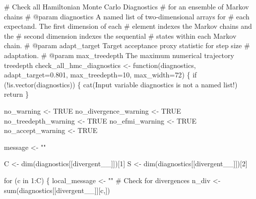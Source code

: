 \documentclass[
  letterpaper,
  DIV=11,
  numbers=noendperiod]{scrartcl}
\newenvironment{Shaded}{\begin{snugshade}}{\end{snugshade}}
\newcommand{\AttributeTok}[1]{\textcolor[rgb]{0.40,0.45,0.13}{#1}}
\newcommand{\CommentTok}[1]{\textcolor[rgb]{0.37,0.37,0.37}{#1}}
\newcommand{\ConstantTok}[1]{\textcolor[rgb]{0.56,0.35,0.01}{#1}}
\newcommand{\ControlFlowTok}[1]{\textcolor[rgb]{0.00,0.23,0.31}{#1}}
\newcommand{\DecValTok}[1]{\textcolor[rgb]{0.68,0.00,0.00}{#1}}
\newcommand{\FloatTok}[1]{\textcolor[rgb]{0.68,0.00,0.00}{#1}}
\newcommand{\FunctionTok}[1]{\textcolor[rgb]{0.28,0.35,0.67}{#1}}
\newcommand{\NormalTok}[1]{\textcolor[rgb]{0.00,0.23,0.31}{#1}}
\newcommand{\OtherTok}[1]{\textcolor[rgb]{0.00,0.23,0.31}{#1}}
\newcommand{\SpecialCharTok}[1]{\textcolor[rgb]{0.37,0.37,0.37}{#1}}
\newcommand{\StringTok}[1]{\textcolor[rgb]{0.13,0.47,0.30}{#1}}
\begin{document}
\begin{Shaded}
\begin{Highlighting}[]
\CommentTok{\# Check all Hamiltonian Monte Carlo Diagnostics }
\CommentTok{\# for an ensemble of Markov chains}
\CommentTok{\# @param diagnostics A named list of two{-}dimensional arrays for }
\CommentTok{\#                    each expectand.  The first dimension of each}
\CommentTok{\#                    element indexes the Markov chains and the }
\CommentTok{\#                    second dimension indexes the sequential }
\CommentTok{\#                    states within each Markov chain.}
\CommentTok{\# @param adapt\_target Target acceptance proxy statistic for step size }
\CommentTok{\#                     adaptation.}
\CommentTok{\# @param max\_treedepth The maximum numerical trajectory treedepth}
\NormalTok{check\_all\_hmc\_diagnostics }\OtherTok{\textless{}{-}} \ControlFlowTok{function}\NormalTok{(diagnostics,}
                                      \AttributeTok{adapt\_target=}\FloatTok{0.801}\NormalTok{,}
                                      \AttributeTok{max\_treedepth=}\DecValTok{10}\NormalTok{,}
                                      \AttributeTok{max\_width=}\DecValTok{72}\NormalTok{) \{}
  \ControlFlowTok{if}\NormalTok{ (}\SpecialCharTok{!}\FunctionTok{is.vector}\NormalTok{(diagnostics)) \{}
    \FunctionTok{cat}\NormalTok{(}\StringTok{\textquotesingle{}Input variable \textasciigrave{}diagnostics\textasciigrave{} is not a named list!\textquotesingle{}}\NormalTok{)}
\NormalTok{    return}
\NormalTok{  \}}
  
\NormalTok{  no\_warning }\OtherTok{\textless{}{-}} \ConstantTok{TRUE}
\NormalTok{  no\_divergence\_warning }\OtherTok{\textless{}{-}} \ConstantTok{TRUE}
\NormalTok{  no\_treedepth\_warning }\OtherTok{\textless{}{-}} \ConstantTok{TRUE}
\NormalTok{  no\_efmi\_warning }\OtherTok{\textless{}{-}} \ConstantTok{TRUE}
\NormalTok{  no\_accept\_warning }\OtherTok{\textless{}{-}} \ConstantTok{TRUE}
  
\NormalTok{  message }\OtherTok{\textless{}{-}} \StringTok{""}
  
\NormalTok{  C }\OtherTok{\textless{}{-}} \FunctionTok{dim}\NormalTok{(diagnostics[[}\StringTok{\textquotesingle{}divergent\_\_\textquotesingle{}}\NormalTok{]])[}\DecValTok{1}\NormalTok{]}
\NormalTok{  S }\OtherTok{\textless{}{-}} \FunctionTok{dim}\NormalTok{(diagnostics[[}\StringTok{\textquotesingle{}divergent\_\_\textquotesingle{}}\NormalTok{]])[}\DecValTok{2}\NormalTok{]}
  
  \ControlFlowTok{for}\NormalTok{ (c }\ControlFlowTok{in} \DecValTok{1}\SpecialCharTok{:}\NormalTok{C) \{}
\NormalTok{    local\_message }\OtherTok{\textless{}{-}} \StringTok{""}
    \CommentTok{\# Check for divergences}
\NormalTok{    n\_div }\OtherTok{\textless{}{-}} \FunctionTok{sum}\NormalTok{(diagnostics[[}\StringTok{\textquotesingle{}divergent\_\_\textquotesingle{}}\NormalTok{]][c,])}
    

\end{Highlighting}
\end{Shaded}
\end{document}

